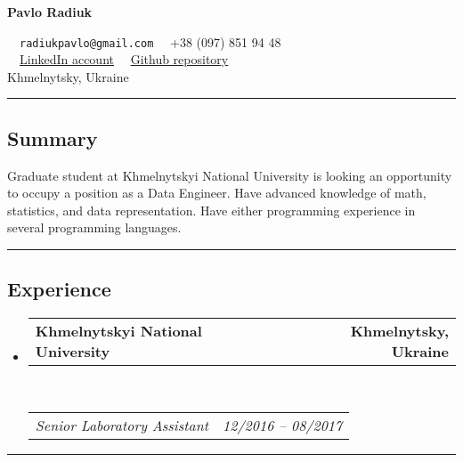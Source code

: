 \documentclass[10pt,letterpaper]{article}
\makeatletter
\newcommand{\headerrow}[2]
{\begin{tabular*}{\linewidth}{l@{\extracolsep{\fill}}r}
	#1 &
	#2 \\
\end{tabular*}}
\makeatother
\begin{document}
\begin{center}
{\LARGE \textbf{Pavlo Radiuk}}

\ \ \texttt{radiukpavlo@gmail.com} \textbullet
\ \ +38 (097) 851 94 48 
\\
\ \ \href{https://www.linkedin.com/in/pavlo-radiuk-487029123/}{LinkedIn account} \textbullet
\ \ \href{https://github.com/soolstafir}{Github repository}
\\
Khmelnytsky, Ukraine
\end{center}

\hrule
\vspace{-0.4em}
\subsection*{Summary}

Graduate student at Khmelnytskyi National University is looking an opportunity to occupy a position as a Data Engineer. Have advanced knowledge of math, statistics, and data representation. Have either programming experience in several programming languages.
\\

\hrule
\vspace{-0.4em}
\subsection*{Experience}

\begin{itemize}
	\parskip=0.1em
	
	\item
	\headerrow
		{\textbf{Khmelnytskyi National University}}
		{\textbf{Khmelnytsky, Ukraine}}
	\\
	\headerrow
		{\emph{Senior Laboratory Assistant}}
		{\emph{12/2016 -- 08/2017}}

\end{itemize}

\hrule
\vspace{-0.4em}
\end{document}
